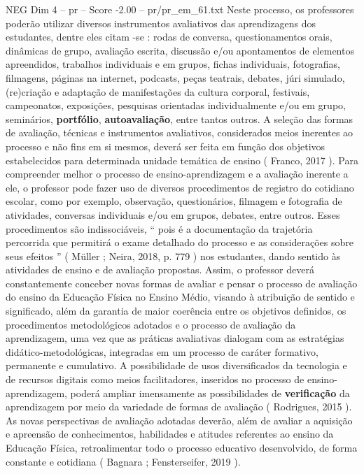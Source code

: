 \begin{textsample}{NEG Dim 4 – pr – Score -2.00 – pr/pr\_em\_61.txt}
Neste processo, os professores poderão utilizar diversos instrumentos avaliativos das aprendizagens dos estudantes, dentre eles citam -se : rodas de conversa, questionamentos orais, dinâmicas de grupo, avaliação escrita, discussão e/ou apontamentos de elementos apreendidos, trabalhos individuais e em grupos, fichas individuais, fotografias, filmagens, páginas na internet, podcasts, peças teatrais, debates, júri simulado, (re)criação e adaptação de manifestações da cultura corporal, festivais, campeonatos, exposições, pesquisas orientadas individualmente e/ou em grupo, seminários, \textbf{portfólio}, \textbf{autoavaliação}, entre tantos outros.
A seleção das formas de avaliação, técnicas e instrumentos avaliativos, considerados meios inerentes ao processo e não fins em si mesmos, deverá ser feita em função dos objetivos estabelecidos para determinada unidade temática de ensino ( Franco, 2017 ).
Para compreender melhor o processo de ensino-aprendizagem e a avaliação inerente a ele, o professor pode fazer uso de diversos procedimentos de registro do cotidiano escolar, como por exemplo, observação, questionários, filmagem e fotografia de atividades, conversas individuais e/ou em grupos, debates, entre outros.
Esses procedimentos são indissociáveis, “ pois é a documentação da trajetória percorrida que permitirá o exame detalhado do processo e as considerações sobre seus efeitos ” ( Müller ; Neira, 2018, p. 779 ) nos estudantes, dando sentido às atividades de ensino e de avaliação propostas.
Assim, o professor deverá constantemente conceber novas formas de avaliar e pensar o processo de avaliação do ensino da Educação Física no Ensino Médio, visando à atribuição de sentido e significado, além da garantia de maior coerência entre os objetivos definidos, os procedimentos metodológicos adotados e o processo de avaliação da aprendizagem, uma vez que as práticas avaliativas dialogam com as estratégias didático-metodológicas, integradas em um processo de caráter formativo, permanente e cumulativo.
A possibilidade de usos diversificados da tecnologia e de recursos digitais como meios facilitadores, inseridos no processo de ensino-aprendizagem, poderá ampliar imensamente as possibilidades de \textbf{verificação} da aprendizagem por meio da variedade de formas de avaliação ( Rodrigues, 2015 ).
As novas perspectivas de avaliação adotadas deverão, além de avaliar a aquisição e apreensão de conhecimentos, habilidades e atitudes referentes ao ensino da Educação Física, retroalimentar todo o processo educativo desenvolvido, de forma constante e cotidiana ( Bagnara ; Fensterseifer, 2019 ).

\end{textsample}
